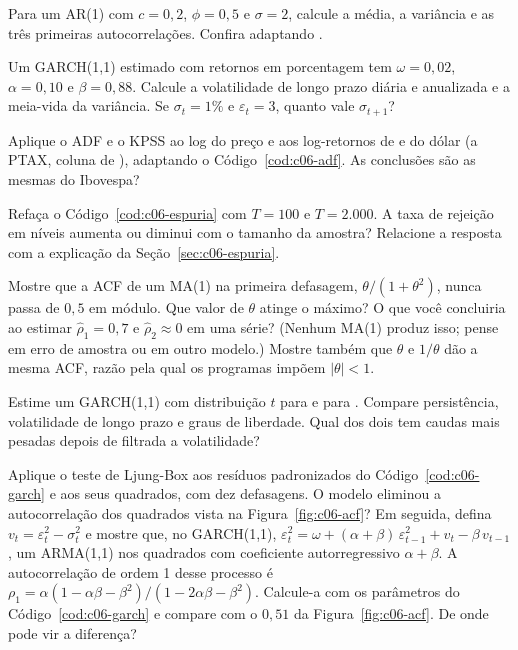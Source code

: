 \begin{exercicios}
  \item {} Para um AR(1) com $c = 0,2$, $\phi = 0,5$ e $\sigma = 2$, calcule a média, a variância e as três primeiras autocorrelações. Confira adaptando .
  \item {} Um GARCH(1,1) estimado com retornos em porcentagem tem $\omega = 0,02$, $\alpha = 0,10$ e $\beta = 0,88$. Calcule a volatilidade de longo prazo diária e anualizada e a meia-vida da variância. Se $\sigma_t = 1\%$ e $\varepsilon_t = 3$, quanto vale $\sigma_{t+1}$?
  \item {} Aplique o ADF e o KPSS ao log do preço e aos log-retornos de  e do dólar (a PTAX, coluna  de ), adaptando o Código~\ref{cod:c06-adf}. As conclusões são as mesmas do Ibovespa?
  \item {} Refaça o Código~\ref{cod:c06-espuria} com $T = 100$ e $T = 2.000$. A taxa de rejeição em níveis aumenta ou diminui com o tamanho da amostra? Relacione a resposta com a explicação da Seção~\ref{sec:c06-espuria}.
  \item {} Mostre que a ACF de um MA(1) na primeira defasagem, $\theta/(1+\theta^2)$, nunca passa de $0,5$ em módulo. Que valor de $\theta$ atinge o máximo? O que você concluiria ao estimar $\hat\rho_1 = 0,7$ e $\hat\rho_2 \approx 0$ em uma série? (Nenhum MA(1) produz isso; pense em erro de amostra ou em outro modelo.) Mostre também que $\theta$ e $1/\theta$ dão a mesma ACF, razão pela qual os programas impõem $|\theta| < 1$.
  \item {} Estime um GARCH(1,1) com distribuição $t$ para  e para . Compare persistência, volatilidade de longo prazo e graus de liberdade. Qual dos dois tem caudas mais pesadas depois de filtrada a volatilidade?
  \item {} Aplique o teste de Ljung-Box aos resíduos padronizados do Código~\ref{cod:c06-garch} e aos seus quadrados, com dez defasagens. O modelo eliminou a autocorrelação dos quadrados vista na Figura~\ref{fig:c06-acf}? Em seguida, defina $v_t = \varepsilon_t^2 - \sigma_t^2$ e mostre que, no GARCH(1,1), $\varepsilon_t^2 = \omega + (\alpha+\beta)\,\varepsilon_{t-1}^2 + v_t - \beta\,v_{t-1}$, um ARMA(1,1) nos quadrados com coeficiente autorregressivo $\alpha+\beta$. A autocorrelação de ordem 1 desse processo é $\rho_1 = \alpha(1-\alpha\beta-\beta^2)/(1-2\alpha\beta-\beta^2)$. Calcule-a com os parâmetros do Código~\ref{cod:c06-garch} e compare com o $0,51$ da Figura~\ref{fig:c06-acf}. De onde pode vir a diferença?

\end{exercicios}
